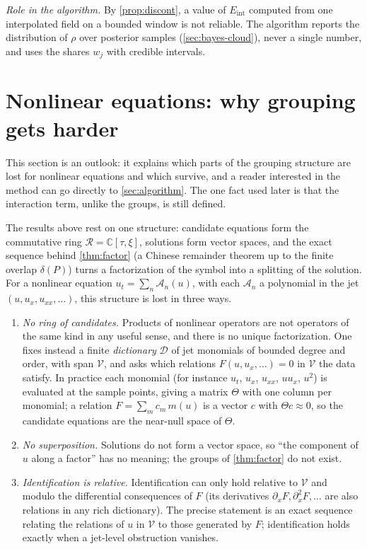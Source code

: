 \documentclass[11pt]{article}
\theoremstyle{plain}
\theoremstyle{definition}
\theoremstyle{remark}
\newcommand{\C}{\mathbb{C}}
\newcommand{\ring}{\mathcal{R}}            %
\newcommand{\Eint}{E_{\mathrm{int}}}        %
\newcommand{\deltaP}{\delta(P)}             %
\newcommand{\roleinalg}[1]{\par\noindent\emph{Role in the algorithm.} #1\par}
\begin{document}
\roleinalg{By \cref{prop:discont}, a value of $\Eint$ computed from one interpolated field on a
bounded window is not reliable. The algorithm reports the distribution of $\rho$ over posterior samples
(\cref{sec:bayes-cloud}), never a single number, and uses the shares $w_j$ with credible intervals.}



\section{Nonlinear equations: why grouping gets harder}\label{sec:nonlinear}
This section is an outlook: it explains which parts of the grouping structure are lost for nonlinear equations and
which survive, and a reader interested in the method can go directly to \cref{sec:algorithm}. The one fact used later
is that the interaction term, unlike the groups, is still defined.


The results above rest on one structure: candidate equations form the commutative ring
$\ring=\C[\tau,\xi]$, solutions form vector spaces, and the exact sequence behind \cref{thm:factor} (a Chinese
remainder theorem up to the finite overlap $\deltaP$) turns a
factorization of the symbol into a splitting of the solution. For a nonlinear equation
$u_t=\sum_n\mathcal A_n(u)$, with each $\mathcal A_n$ a polynomial in the jet $(u,u_x,u_{xx},\dots)$, this structure is lost
in three ways.
\begin{enumerate}[label=(\roman*)]
  \item \emph{No ring of candidates.} Products of nonlinear operators are not operators of the same kind
  in any useful sense, and there is no unique factorization. One fixes instead a finite
  \emph{dictionary} $\mathcal D$ of jet monomials of bounded degree and order, with span $\mathcal V$, and asks
  which relations $F(u,u_x,\dots)=0$ in $\mathcal V$ the data satisfy. In practice each monomial (for instance
  $u_t$, $u_x$, $u_{xx}$, $uu_x$, $u^2$) is evaluated at the sample points, giving a matrix $\Theta$ with one column per
  monomial; a relation $F=\sum_mc_m\,m(u)$ is a vector $c$ with $\Theta c\approx0$, so the candidate equations are the
  near-null space of $\Theta$.
  \item \emph{No superposition.} Solutions do not form a vector space, so ``the component of $u$ along a
  factor'' has no meaning; the groups of \cref{thm:factor} do not exist.
  \item \emph{Identification is relative.} Identification can only hold relative to $\mathcal V$ and modulo the
  differential consequences of $F$ (its derivatives $\partial_xF,\partial_x^2F,\dots$ are also relations in
  any rich dictionary). The precise statement is an exact sequence relating the relations of $u$ in $\mathcal V$
  to those generated by $F$; identification holds exactly when a jet-level obstruction vanishes.
\end{enumerate}
\end{document}
